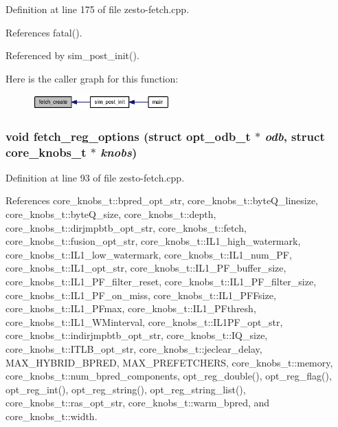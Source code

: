 Definition at line 175 of file zesto-fetch.cpp.

References fatal().

Referenced by sim\_\-post\_\-init().

Here is the caller graph for this function:\nopagebreak
\begin{figure}[H]
\begin{center}
\leavevmode
\includegraphics[width=149pt]{zesto-fetch_8h_9dabdc921dc59e593201a9d42ee1fc63_icgraph}
\end{center}
\end{figure}
\subsubsection[{fetch\_\-reg\_\-options}]{\setlength{\rightskip}{0pt plus 5cm}void fetch\_\-reg\_\-options (struct {\bf opt\_\-odb\_\-t} $\ast$ {\em odb}, \/  struct {\bf core\_\-knobs\_\-t} $\ast$ {\em knobs})}\label{zesto-fetch_8h_45135765b04df4e9a637178a374e6b9d}




Definition at line 93 of file zesto-fetch.cpp.

References core\_\-knobs\_\-t::bpred\_\-opt\_\-str, core\_\-knobs\_\-t::byteQ\_\-linesize, core\_\-knobs\_\-t::byteQ\_\-size, core\_\-knobs\_\-t::depth, core\_\-knobs\_\-t::dirjmpbtb\_\-opt\_\-str, core\_\-knobs\_\-t::fetch, core\_\-knobs\_\-t::fusion\_\-opt\_\-str, core\_\-knobs\_\-t::IL1\_\-high\_\-watermark, core\_\-knobs\_\-t::IL1\_\-low\_\-watermark, core\_\-knobs\_\-t::IL1\_\-num\_\-PF, core\_\-knobs\_\-t::IL1\_\-opt\_\-str, core\_\-knobs\_\-t::IL1\_\-PF\_\-buffer\_\-size, core\_\-knobs\_\-t::IL1\_\-PF\_\-filter\_\-reset, core\_\-knobs\_\-t::IL1\_\-PF\_\-filter\_\-size, core\_\-knobs\_\-t::IL1\_\-PF\_\-on\_\-miss, core\_\-knobs\_\-t::IL1\_\-PFFsize, core\_\-knobs\_\-t::IL1\_\-PFmax, core\_\-knobs\_\-t::IL1\_\-PFthresh, core\_\-knobs\_\-t::IL1\_\-WMinterval, core\_\-knobs\_\-t::IL1PF\_\-opt\_\-str, core\_\-knobs\_\-t::indirjmpbtb\_\-opt\_\-str, core\_\-knobs\_\-t::IQ\_\-size, core\_\-knobs\_\-t::ITLB\_\-opt\_\-str, core\_\-knobs\_\-t::jeclear\_\-delay, MAX\_\-HYBRID\_\-BPRED, MAX\_\-PREFETCHERS, core\_\-knobs\_\-t::memory, core\_\-knobs\_\-t::num\_\-bpred\_\-components, opt\_\-reg\_\-double(), opt\_\-reg\_\-flag(), opt\_\-reg\_\-int(), opt\_\-reg\_\-string(), opt\_\-reg\_\-string\_\-list(), core\_\-knobs\_\-t::ras\_\-opt\_\-str, core\_\-knobs\_\-t::warm\_\-bpred, and core\_\-knobs\_\-t::width.